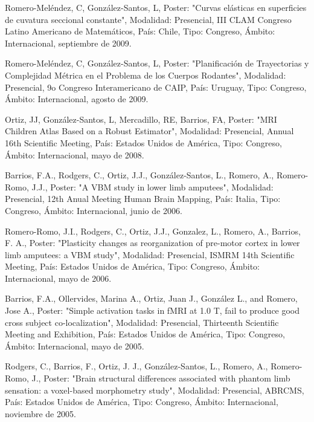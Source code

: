 \item  Romero-Meléndez, C, González-Santos, L, Poster: "Curvas elásticas en superficies de cuvatura seccional constante", 
Modalidad: Presencial, III CLAM Congreso Latino Americano de Matemáticos, País: Chile, Tipo: Congreso, Ámbito: Internacional, 
septiembre de 2009.

\item  Romero-Meléndez, C, González-Santos, L, Poster: "Planificación de Trayectorias y Complejidad Métrica en el Problema de 
los Cuerpos Rodantes", Modalidad: Presencial, 9o Congreso Interamericano de CAIP, País: Uruguay, Tipo: Congreso, Ámbito: 
Internacional, agosto de 2009.

\item  Ortiz, JJ, González-Santos, L, Mercadillo, RE, Barrios, FA, Poster: "MRI Children Atlas Based on a Robust Estimator", 
Modalidad: Presencial, Annual 16th Scientific Meeting, País: Estados Unidos de América, Tipo: Congreso, Ámbito: 
Internacional, mayo de 2008.

\item  Barrios, F.A., Rodgers, C., Ortiz, J.J., González-Santos, L., Romero, A., Romero-Romo, J.J., Poster: "A VBM study in 
lower limb amputees", Modalidad: Presencial, 12th Anual Meeting Human Brain Mapping, País: Italia, Tipo: Congreso, Ámbito: 
Internacional, junio de 2006.

\item  Romero-Romo, J.I., Rodgers, C., Ortiz, J.J., Gonzalez, L., Romero, A., Barrios, F. A., Poster: "Plasticity changes as 
reorganization of pre-motor cortex in lower limb amputees: a VBM study", Modalidad: Presencial, ISMRM 14th Scientific 
Meeting, País: Estados Unidos de América, Tipo: Congreso, Ámbito: Internacional, mayo de 2006.

\item  Barrios, F.A., Ollervides, Marina A., Ortiz, Juan J., González L., and Romero, Jose A., Poster: "Simple activation 
tasks 
in fMRI at 1.0 T, fail to produce good cross subject co-localization", Modalidad: Presencial, Thirteenth Scientific Meeting 
and Exhibition, País: Estados Unidos de América, Tipo: Congreso, Ámbito: Internacional, mayo de 2005.

\item  Rodgers, C., Barrios, F., Ortiz, J. J., González-Santos, L., Romero, A., Romero-Romo, J., Poster: "Brain structural 
differences associated with phantom limb sensation: a voxel-based morphometry study", Modalidad: Presencial, ABRCMS, País: 
Estados Unidos de América, Tipo: Congreso, Ámbito: Internacional, noviembre de 2005.

